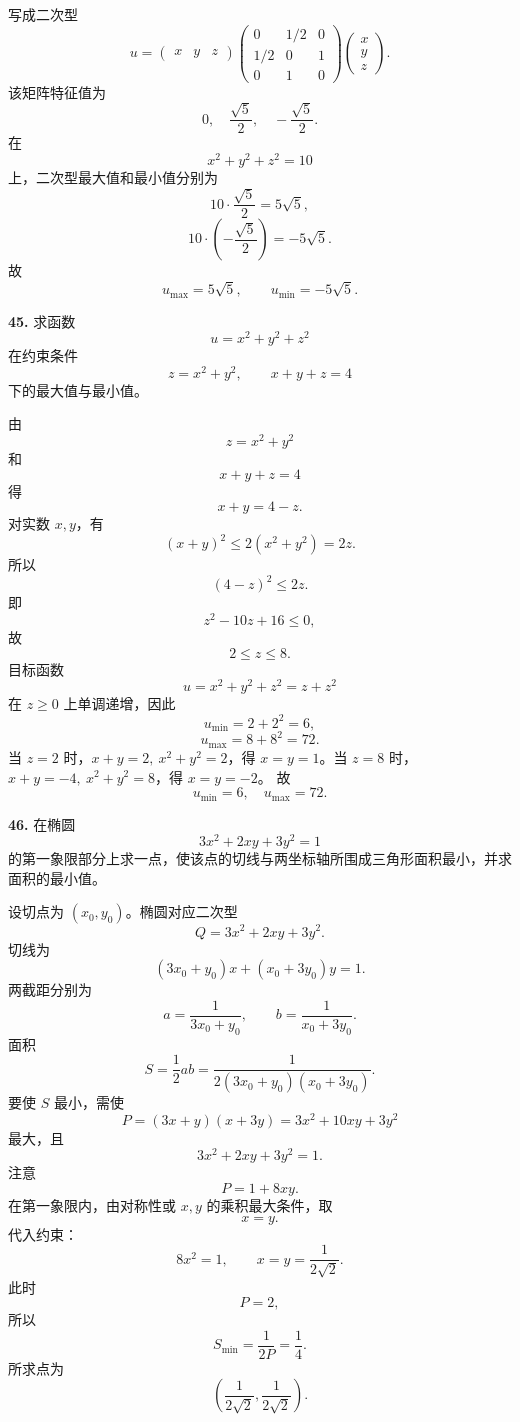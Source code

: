 \begin{solutionblock}
写成二次型
\[
u=
\begin{pmatrix}x&y&z\end{pmatrix}
\begin{pmatrix}
0&1/2&0\\
1/2&0&1\\
0&1&0
\end{pmatrix}
\begin{pmatrix}x\\y\\z\end{pmatrix}.
\]
该矩阵特征值为
\[
0,\quad \frac{\sqrt5}{2},\quad -\frac{\sqrt5}{2}.
\]
在
\[
x^2+y^2+z^2=10
\]
上，二次型最大值和最小值分别为
\[
10\cdot\frac{\sqrt5}{2}=5\sqrt5,
\]
\[
10\cdot\left(-\frac{\sqrt5}{2}\right)=-5\sqrt5.
\]
故
\[
\boxed{u_{\max}=5\sqrt5,\qquad u_{\min}=-5\sqrt5}.
\]
\end{solutionblock}

\begin{problemblock}
\textbf{45.} 求函数
\[
u=x^2+y^2+z^2
\]
在约束条件
\[
z=x^2+y^2,\qquad x+y+z=4
\]
下的最大值与最小值。
\end{problemblock}

\begin{solutionblock}
由
\[
z=x^2+y^2
\]
和
\[
x+y+z=4
\]
得
\[
x+y=4-z.
\]
对实数 \(x,y\)，有
\[
(x+y)^2\le2(x^2+y^2)=2z.
\]
所以
\[
(4-z)^2\le2z.
\]
即
\[
z^2-10z+16\le0,
\]
故
\[
2\le z\le8.
\]
目标函数
\[
u=x^2+y^2+z^2=z+z^2
\]
在 \(z\ge0\) 上单调递增，因此
\[
u_{\min}=2+2^2=6,
\]
\[
u_{\max}=8+8^2=72.
\]
当 \(z=2\) 时，\(x+y=2,\ x^2+y^2=2\)，得 \(x=y=1\)。当 \(z=8\) 时，\(x+y=-4,\ x^2+y^2=8\)，得 \(x=y=-2\)。
故
\[
\boxed{u_{\min}=6,\quad u_{\max}=72}.
\]
\end{solutionblock}

\begin{problemblock}
\textbf{46.} 在椭圆
\[
3x^2+2xy+3y^2=1
\]
的第一象限部分上求一点，使该点的切线与两坐标轴所围成三角形面积最小，并求面积的最小值。
\end{problemblock}

\begin{solutionblock}
设切点为 \((x_0,y_0)\)。椭圆对应二次型
\[
Q=3x^2+2xy+3y^2.
\]
切线为
\[
(3x_0+y_0)x+(x_0+3y_0)y=1.
\]
两截距分别为
\[
a=\frac1{3x_0+y_0},\qquad
b=\frac1{x_0+3y_0}.
\]
面积
\[
S=\frac12ab
=\frac1{2(3x_0+y_0)(x_0+3y_0)}.
\]
要使 \(S\) 最小，需使
\[
P=(3x+y)(x+3y)
=3x^2+10xy+3y^2
\]
最大，且
\[
3x^2+2xy+3y^2=1.
\]
注意
\[
P=1+8xy.
\]
在第一象限内，由对称性或 \(x,y\) 的乘积最大条件，取
\[
x=y.
\]
代入约束：
\[
8x^2=1,
\qquad x=y=\frac1{2\sqrt2}.
\]
此时
\[
P=2,
\]
所以
\[
S_{\min}=\frac1{2P}=\boxed{\frac14}.
\]
所求点为
\[
\boxed{\left(\frac1{2\sqrt2},\frac1{2\sqrt2}\right)}.
\]
\end{solutionblock}

